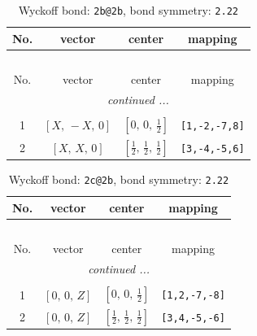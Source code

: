 \documentclass[fleqn,8pt]{jsarticle}
\begin{document}
\renewcommand{\arraystretch}{1.2}
\begin{longtable}{cccc}
\caption{Wyckoff bond: {\tt 2b@2b}, bond symmetry: {\tt 2.22}}
 \\
 \hline \hline
No. & vector & center & mapping \\ \hline \endfirsthead

\multicolumn{3}{l}{\tablename\ \thetable{}} \\
 \hline \hline
No. & vector & center & mapping \\ \hline \endhead

 \hline \hline
\multicolumn{3}{r}{\footnotesize\it continued ...} \\ \endfoot

 \hline \hline
\multicolumn{3}{r}{} \\ \endlastfoot

1 & $\left[ X,\, - X,\, 0 \right]$ & $\left[ 0,\, 0,\, \frac{1}{2} \right]$ & {\tt [1,-2,-7,8]} \\ \hline
2 & $\left[ X,\, X,\, 0 \right]$ & $\left[ \frac{1}{2},\, \frac{1}{2},\, \frac{1}{2} \right]$ & {\tt [3,-4,-5,6]} \\
\end{longtable}
\renewcommand{\arraystretch}{1.2}
\begin{longtable}{cccc}
\caption{Wyckoff bond: {\tt 2c@2b}, bond symmetry: {\tt 2.22}}
 \\
 \hline \hline
No. & vector & center & mapping \\ \hline \endfirsthead

\multicolumn{3}{l}{\tablename\ \thetable{}} \\
 \hline \hline
No. & vector & center & mapping \\ \hline \endhead

 \hline \hline
\multicolumn{3}{r}{\footnotesize\it continued ...} \\ \endfoot

 \hline \hline
\multicolumn{3}{r}{} \\ \endlastfoot

1 & $\left[ 0,\, 0,\, Z \right]$ & $\left[ 0,\, 0,\, \frac{1}{2} \right]$ & {\tt [1,2,-7,-8]} \\ \hline
2 & $\left[ 0,\, 0,\, Z \right]$ & $\left[ \frac{1}{2},\, \frac{1}{2},\, \frac{1}{2} \right]$ & {\tt [3,4,-5,-6]} \\
\end{longtable}
\renewcommand{\arraystretch}{1.2}
\end{document}
